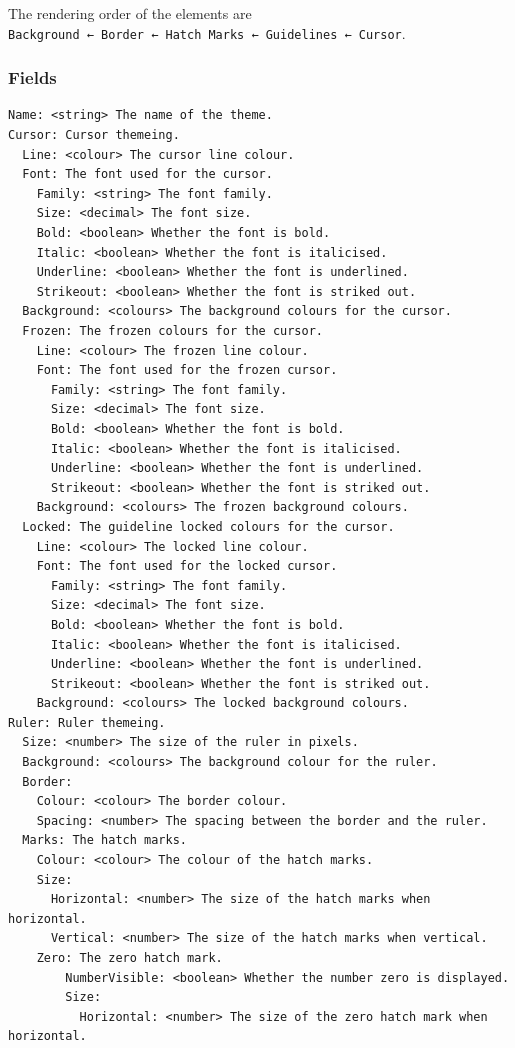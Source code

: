 \documentclass[
]{book}
\begin{document}
The rendering order of the elements are \texttt{Background\ ←\ Border\ ←\ Hatch\ Marks\ ←\ Guidelines\ ←\ Cursor}.

\subsubsection{Fields}\label{fields}

\begin{verbatim}
Name: <string> The name of the theme.
Cursor: Cursor themeing.
  Line: <colour> The cursor line colour.
  Font: The font used for the cursor.
    Family: <string> The font family.
    Size: <decimal> The font size.
    Bold: <boolean> Whether the font is bold.
    Italic: <boolean> Whether the font is italicised.
    Underline: <boolean> Whether the font is underlined.
    Strikeout: <boolean> Whether the font is striked out.
  Background: <colours> The background colours for the cursor.
  Frozen: The frozen colours for the cursor.
    Line: <colour> The frozen line colour.
    Font: The font used for the frozen cursor.
      Family: <string> The font family.
      Size: <decimal> The font size.
      Bold: <boolean> Whether the font is bold.
      Italic: <boolean> Whether the font is italicised.
      Underline: <boolean> Whether the font is underlined.
      Strikeout: <boolean> Whether the font is striked out.
    Background: <colours> The frozen background colours.
  Locked: The guideline locked colours for the cursor.
    Line: <colour> The locked line colour.
    Font: The font used for the locked cursor.
      Family: <string> The font family.
      Size: <decimal> The font size.
      Bold: <boolean> Whether the font is bold.
      Italic: <boolean> Whether the font is italicised.
      Underline: <boolean> Whether the font is underlined.
      Strikeout: <boolean> Whether the font is striked out.
    Background: <colours> The locked background colours.
Ruler: Ruler themeing.
  Size: <number> The size of the ruler in pixels.
  Background: <colours> The background colour for the ruler.
  Border:
    Colour: <colour> The border colour.
    Spacing: <number> The spacing between the border and the ruler.
  Marks: The hatch marks.
    Colour: <colour> The colour of the hatch marks.
    Size:
      Horizontal: <number> The size of the hatch marks when horizontal.
      Vertical: <number> The size of the hatch marks when vertical.
    Zero: The zero hatch mark.
        NumberVisible: <boolean> Whether the number zero is displayed.
        Size:
          Horizontal: <number> The size of the zero hatch mark when horizontal.

\end{verbatim}
\end{document}
